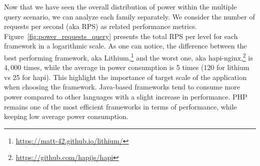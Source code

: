 \begin{table}[bth]
    \raggedright
    \caption{Average power consumption of frameworks based on the database type}
    \label{table:query_db_row}
\end{table}

Now that we have seen the overall distribution of power within the multiple query scenario, we can analyze each family separately.
We consider the number of requests per second (aka RPS) as related performance metrics.
Figure~\ref{fig:power_requests_query} presents the total RPS per level for each framework in a logarithmic scale.
As one can notice, the difference between the best performing framework, aka Lithium,\footnote{\url{https://matt-42.github.io/lithium/}} and the worst one, aka hapi-nginx,\footnote{\url{https://github.com/hapijs/hapi}} is $4,000$ times, while the average in power consumption is 5 times (120 for lithium vs 25 for hapi).
This highlight the importance of target scale of the application when choosing the framework.
Java-based frameworks tend to consume more power compared to other languages with a slight increase in performance.
PHP remains one of the most efficient frameworks in terms of performance, while keeping low average power consumption.

